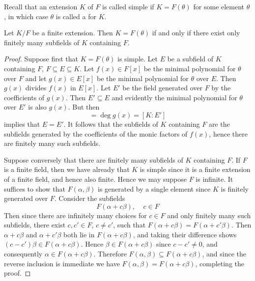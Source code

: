 \documentclass[12pt, a4paper, oneside, openright, titlepage]{book}
\begin{document}
Recall that an extension $K$ of $F$ is called simple if $K = F(\theta)$ for some element $\theta$, in which case $\theta$ is called a  for $K$.

\begin{prop}
    Let $K/F$ be a finite extension. Then $K = F(\theta)$ if and only if there exist only finitely many subfields of $K$ containing $F$.
\end{prop}
\begin{proof}
    Suppose first that $K = F(\theta)$ is simple. Let $E$ be a subfield of $K$ containing $F$, $F\subseteq E\subseteq K$. Let $f(x) \in F[x]$ be the minimal polynomial for $\theta$ over $F$ and let $g(x) \in E[x]$ be the minimal polynomial for $\theta$ over $E$. Then $g(x)$ divides $f(x)$ in $E[x]$. Let $E'$ be the field generated over $F$ by the coefficients of $g(x)$. Then $E'\subseteq E$ and evidently the minimal polynomial for $\theta$ over $E'$ is also $g(x)$. But then \begin{equation*}
        [K:E] = \deg g(x) = [K:E']
    \end{equation*}
    implies that $E = E'$. It follows that the subfields of $K$ containing $F$ are the subfields generated by the coefficients of the monic factors of $f(x)$, hence there are finitely many such subfields.

    Suppose conversely that there are finitely many subfields of $K$ containing $F$. If $F$ is a finite field, then we have already that $K$ is simple since it is a finite extension of a finite field, and hence also finite. Hence we may suppose $F$ is infinite. It suffices to show that $F(\alpha,\beta)$ is generated by a single element since $K$ is finitely generated over $F$. Consider the subfields \begin{equation*}
        F(\alpha+c\beta),\;\;\;\;c \in F
    \end{equation*}
    Then since there are infinitely many choices for $c \in F$ and only finitely many such subfields, there exist $c,c' \in F$, $c \neq c'$, such that $F(\alpha+c\beta) = F(\alpha+c'\beta)$. Then $\alpha+c\beta$ and $\alpha+c'\beta$ both lie in $F(\alpha+c\beta)$, and taking their difference shows $(c-c')\beta \in F(\alpha+c\beta)$. Hence $\beta \in F(\alpha+c\beta)$ since $c-c' \neq 0$, and consequently $\alpha \in F(\alpha+c\beta)$. Therefore $F(\alpha,\beta) \subseteq F(\alpha+c\beta)$, and since the reverse inclusion is immediate we have $F(\alpha,\beta) = F(\alpha+c\beta)$, completing the proof.
\end{proof}
\end{document}
